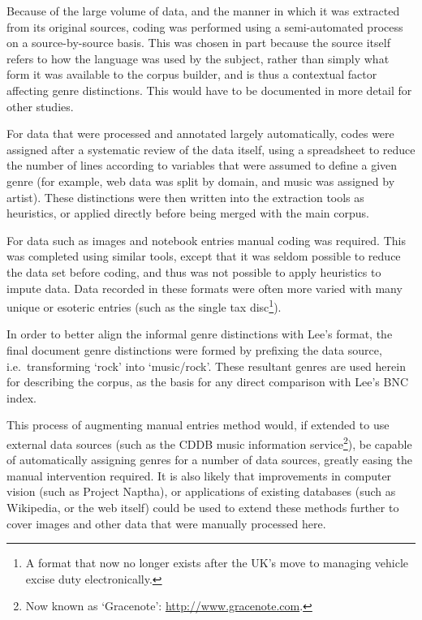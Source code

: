 Because of the large volume of data, and the manner in which it was extracted from its original sources, coding was performed using a semi-automated process on a source-by-source basis.  This was chosen in part because the source itself refers to how the language was used by the subject, rather than simply what form it was available to the corpus builder, and is thus a contextual factor affecting genre distinctions.  This would have to be documented in more detail for other studies.

For data that were processed and annotated largely automatically, codes were assigned after a systematic review of the data itself, using a spreadsheet to reduce the number of lines according to variables that were assumed to define a given genre (for example, web data was split by domain, and music was assigned by artist).  These distinctions were then written into the extraction tools as heuristics, or applied directly before being merged with the main corpus.

For data such as images and notebook entries manual coding was required.  This was completed using similar tools, except that it was seldom possible to reduce the data set before coding, and thus was not possible to apply heuristics to impute data.  Data recorded in these formats were often more varied with many unique or esoteric entries (such as the single tax disc\footnote{A format that now no longer exists after the UK's move to managing vehicle excise duty electronically.}).

In order to better align the informal genre distinctions with Lee's format, the final document genre distinctions were formed by prefixing the data source, i.e.\ transforming `rock' into `music/rock'.  These resultant genres are used herein for describing the corpus, as the basis for any direct comparison with Lee's BNC index.




This process of augmenting manual entries method would, if extended to use external data sources (such as the CDDB music information service\footnote{Now known as `Gracenote': \url{http://www.gracenote.com}.}), be capable of automatically assigning genres for a number of data sources, greatly easing the manual intervention required.  It is also likely that improvements in computer vision (such as Project Naptha\cite{naptha2014homepage}), or applications of existing databases (such as Wikipedia, or the web itself) could be used to extend these methods further to cover images and other data that were manually processed here.
